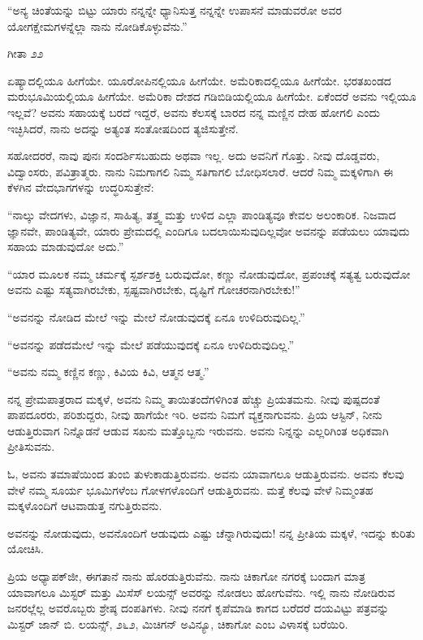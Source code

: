 “ಅನ್ಯ ಚಿಂತೆಯನ್ನು ಬಿಟ್ಟು ಯಾರು ನನ್ನನ್ನೇ ಧ್ಯಾನಿಸುತ್ತ ನನ್ನನ್ನೇ ಉಪಾಸನೆ ಮಾಡುವರೋ ಅವರ ಯೋಗಕ್ಷೇಮಗಳನ್ನೆಲ್ಲಾ ನಾನು ನೋಡಿಕೊಳ್ಳುವೆನು.”

\begin{flushright}
ಗೀತಾ  \enginline{-}೨೨
\end{flushright}

ಏಷ್ಯಾದಲ್ಲಿಯೂ ಹೀಗೆಯೇ. ಯೂರೋಪಿನಲ್ಲಿಯೂ ಹೀಗೆಯೇ. ಅಮೆರಿಕಾ\break ದಲ್ಲಿಯೂ ಹೀಗೆಯೇ. ಭರತಖಂಡದ ಮರುಭೂಮಿಯಲ್ಲಿಯೂ ಹೀಗೆಯೇ. ಅಮೆರಿಕಾ ದೇಶದ ಗಡಿಬಿಡಿಯಲ್ಲಿಯೂ ಹೀಗೆಯೇ. ಏಕೆಂದರೆ ಅವನು ಇಲ್ಲಿಯೂ ಇಲ್ಲವೆ? ಅವನು ಸಹಾಯಕ್ಕೆ ಬರದೆ ಇದ್ದರೆ, ಅವನು ಕೆಲಸಕ್ಕೆ ಬಾರದ ನನ್ನ ಮಣ್ಣಿನ ದೇಹ ಹೋಗಲಿ ಎಂದು ಇಚ್ಛಿಸಿದರೆ, ನಾನು ಅದನ್ನು ಅತ್ಯಂತ ಸಂತೋಷದಿಂದ ತ್ಯಜಿಸುತ್ತೇನೆ.

ಸಹೋದರರೆ, ನಾವು ಪುನಃ ಸಂದರ್ಶಿಸಬಹುದು ಅಥವಾ ಇಲ್ಲ. ಅದು ಅವನಿಗೆ ಗೊತ್ತು. ನೀವು ದೊಡ್ಡವರು, ವಿದ್ವಾಂಸರು, ಪವಿತ್ರಾತ್ಮರು. ನಾನು ನಿಮಗಾಗಲಿ ನಿಮ್ಮ ಸತಿಗಾಗಲಿ ಬೋಧಿಸಲಾರೆ. ಆದರೆ ನಿಮ್ಮ ಮಕ್ಕಳಿಗಾಗಿ ಈ ಕೆಳಗಿನ ವೇದಭಾಗಗಳನ್ನು ಉದ್ಧರಿಸುತ್ತೇನೆ:

“ನಾಲ್ಕು ವೇದಗಳು, ವಿಜ್ಞಾನ, ಸಾಹಿತ್ಯ, ತತ್ತ್ವ ಮತ್ತು ಉಳಿದ ಎಲ್ಲಾ ಪಾಂಡಿತ್ಯವೂ ಕೇವಲ ಅಲಂಕಾರಿಕ. ನಿಜವಾದ ಜ್ಞಾನವೇ, ಪಾಂಡಿತ್ಯವೇ, ಯಾರು ಪ್ರೇಮದಲ್ಲಿ ಎಂದಿಗೂ ಬದಲಾಯಿಸುವುದಿಲ್ಲವೋ ಅವನನ್ನು ಪಡೆಯಲು ಯಾವುದು ಸಹಾಯ ಮಾಡುವುದೋ ಅದು.”

“ಯಾರ ಮೂಲಕ ನಮ್ಮ ಚರ್ಮಕ್ಕೆ ಸ್ಪರ್ಶಶಕ್ತಿ ಬರುವುದೋ, ಕಣ್ಣು ನೋಡುವುದೋ, ಪ್ರಪಂಚಕ್ಕೆ ಸತ್ಯತ್ವ ಬರುವುದೋ ಅವನು ಎಷ್ಟು ಸತ್ಯವಾಗಿರಬೇಕು, ಸ್ಪಷ್ಟವಾಗಿರಬೇಕು, ದೃಷ್ಟಿಗೆ ಗೋಚರನಾಗಿರಬೇಕು!”

“ಅವನನ್ನು ನೋಡಿದ ಮೇಲೆ ಇನ್ನು ಮೇಲೆ ನೋಡುವುದಕ್ಕೆ ಏನೂ ಉಳಿದಿರುವುದಿಲ್ಲ.”

“ಅವನನ್ನು ಪಡೆದಮೇಲೆ ಇನ್ನು ಮೇಲೆ ಪಡೆಯುವುದಕ್ಕೆ ಏನೂ ಉಳಿದಿರುವುದಿಲ್ಲ.”

“ಅವನು ನಮ್ಮ ಕಣ್ಣಿನ ಕಣ್ಣು, ಕಿವಿಯ ಕಿವಿ, ಆತ್ಮನ ಆತ್ಮ.”

ನನ್ನ ಪ್ರೇಮಪಾತ್ರರಾದ ಮಕ್ಕಳೆ, ಅವನು ನಿಮ್ಮ ತಾಯಿತಂದೆಗಳಿಗಿಂತ ಹೆಚ್ಚು ಪ್ರಿಯತಮನು. ನೀವು ಪುಷ್ಪದಂತೆ ಪಾಪದೂರರು, ಪರಿಶುದ್ದರು, ನೀವು ಹಾಗೆಯೇ ಇರಿ. ಅವನು ನಿಮಗೆ ವ್ಯಕ್ತನಾಗುವನು. ಪ್ರಿಯ ಆಸ್ಟಿನ್, ನೀನು ಆಡುತ್ತಿರುವಾಗ ನಿನ್ನೊಡನೆ ಆಡುವ ಸಖನು ಮತ್ತೊಬ್ಬನು ಇರುವನು. ಅವನು ನಿನ್ನನ್ನು ಎಲ್ಲರಿಗಿಂತ ಅಧಿಕವಾಗಿ ಪ್ರೀತಿಸುವನು.

ಓ, ಅವನು ತಮಾಷೆಯಿಂದ ತುಂಬಿ ತುಳುಕಾಡುತ್ತಿರುವನು. ಅವನು ಯಾವಾಗಲೂ ಆಡುತ್ತಿರುವನು. ಅವನು ಕೆಲವು ವೇಳೆ ನಮ್ಮ ಸೂರ್ಯ ಭೂಮಿಗಳೆಂಬ ಗೋಳಗಳೊಂದಿಗೆ ಆಡುತ್ತಿರುವನು. ಮತ್ತೆ ಕೆಲವು ವೇಳೆ ನಿಮ್ಮಂತಹ ಮಕ್ಕಳೊಂದಿಗೆ ಆಟವಾಡುತ್ತ ನಗುತ್ತಿರುವನು.

ಅವನನ್ನು ನೋಡುವುದು, ಅವನೊಂದಿಗೆ ಆಡುವುದು ಎಷ್ಟು ಚೆನ್ನಾಗಿರುವುದು! ನನ್ನ ಪ್ರೀತಿಯ ಮಕ್ಕಳೆ, ಇದನ್ನು ಕುರಿತು ಯೋಚಿಸಿ.

\newpage

ಪ್ರಿಯ ಅಧ್ಯಾಪಕ್‌ಜೀ, ಈಗತಾನೆ ನಾನು ಹೊರಡುತ್ತಿರುವೆನು. ನಾನು ಚಿಕಾಗೋ ನಗರಕ್ಕೆ ಬಂದಾಗ ಮಾತ್ರ ಯಾವಾಗಲೂ ಮಿಸ್ಟರ್ ಮತ್ತು ಮಿಸೆಸ್ ಲಯನ್ಸ್ ಅವರನ್ನು ನೋಡಲು ಹೋಗುವೆನು. ಇಲ್ಲಿ ನಾನು ನೋಡಿರುವ ಜನರಲ್ಲೆಲ್ಲ ಅವರೊಬ್ಬರು ಶ್ರೇಷ್ಠ ದಂಪತಿಗಳು. ನೀವು ನನಗೆ ಕೃಪೆಮಾಡಿ ಕಾಗದ ಬರೆದರೆ ದಯವಿಟ್ಟು ಪತ್ರವನ್ನು ಮಿಸ್ಟರ್ ಜಾನ್ ಬಿ. ಲಯನ್ಸ್, ೨೬೨, ಮಿಚಿಗನ್ ಅವಿನ್ಯೂ, ಚಿಕಾಗೋ ಎಂಬ ವಿಳಾಸಕ್ಕೆ ಬರೆಯಿರಿ.

